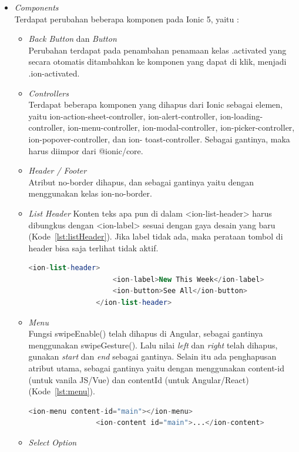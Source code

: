 \begin{enumerate}
\begin{itemize}
		\item {\it Components}\\
		Terdapat perubahan beberapa komponen pada Ionic 5, yaitu :
		\begin{itemize}
			\item {\it Back Button} dan {\it Button} \\
			Perubahan terdapat pada penambahan penamaan kelas .activated yang secara otomatis ditambahkan ke komponen yang dapat di klik, menjadi .ion-activated.
			\item {\it Controllers}\\
			Terdapat beberapa komponen yang dihapus dari Ionic sebagai elemen, yaitu ion-action-sheet-controller, ion-alert-controller, ion-loading-controller, ion-menu-controller, ion-modal-controller, ion-picker-controller, ion-popover-controller, dan ion- toast-controller. Sebagai gantinya, maka harus diimpor dari @ionic/core. 
			\item {\it Header / Footer}\\
			Atribut no-border dihapus, dan sebagai gantinya yaitu dengan menggunakan kelas ion-no-border.
			\item {\it List Header}
			Konten teks apa pun di dalam <ion-list-header> harus dibungkus dengan <ion-label> sesuai dengan gaya desain yang baru (Kode~\ref{lst:listHeader}). Jika label tidak ada, maka perataan tombol di header bisa saja terlihat tidak aktif.
			\begin{lstlisting}[language=php, label={lst:listHeader}, caption=Kode Program untuk List Header]
				<ion-list-header>
					<ion-label>New This Week</ion-label>
					<ion-button>See All</ion-button>
				</ion-list-header>
			\end{lstlisting}
			\item {\it Menu}\\
			Fungsi swipeEnable() telah dihapus di Angular, sebagai gantinya menggunakan swipeGesture(). Lalu nilai {\it left} dan {\it right} telah dihapus, gunakan {\it start} dan {\it end} sebagai gantinya. Selain itu ada penghapusan atribut utama, sebagai gantinya yaitu dengan menggunakan content-id (untuk vanila JS/Vue) dan contentId (untuk Angular/React) (Kode~\ref{lst:menu}).
			\begin{lstlisting}[language=php, label={lst:menu}, caption=Kode Program untuk Menu]
				<ion-menu content-id="main"></ion-menu>
				<ion-content id="main">...</ion-content>
			\end{lstlisting}
			\item {\it Select Option} \\

\end{itemize}
\end{itemize}
\end{enumerate}
